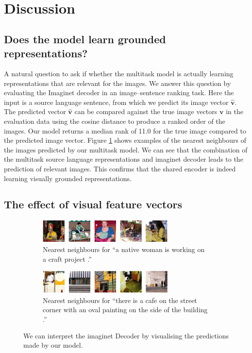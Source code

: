 \section{Discussion}

\subsection{Does the model learn grounded representations?}

A natural question to ask if whether the multitask model is actually learning representations that are relevant for the images. We answer this question by evaluating the Imaginet decoder in an image--sentence ranking task. Here the input is a source language sentence, from which we predict its image vector $\mathbf{\hat{v}}$. The predicted vector $\mathbf{\hat{v}}$ can be compared against the true image vectors $\mathbf{v}$ in the evaluation data using the cosine distance to produce a ranked order of the images. Our model returns a median rank of 11.0 for the true image compared to the predicted image vector.
Figure \ref{fig:discussion:examples} shows examples of the nearest neighbours of the images predicted by our multitask model. We can see that the combination of the multitask source language representations and {\sc imaginet} decoder
leads to the prediction of relevant images. This confirms that the shared encoder is indeed learning visually grounded representations.

\subsection{The effect of visual feature vectors}

\begin{figure}
 \begin{subfigure}[b]{1\textwidth}
 \centering
\includegraphics[width=0.75\textwidth]{chapters/IJCNLP/images/dev_example_notext.png}
\caption{Nearest neighbours for ``a native woman is working on a craft project .''}
\vspace{2ex}
\end{subfigure}
 \begin{subfigure}[b]{1\textwidth}
 \centering
\includegraphics[width=0.75\textwidth]{chapters/IJCNLP/images/dev_example2_notext.png}
\caption{Nearest neighbours for ``there is a cafe on the street corner with an oval painting on the side of the building .''}
\end{subfigure}
\caption{We can interpret the {\sc imaginet} Decoder by visualising the predictions made by our model.}\label{fig:discussion:examples}
\end{figure}


